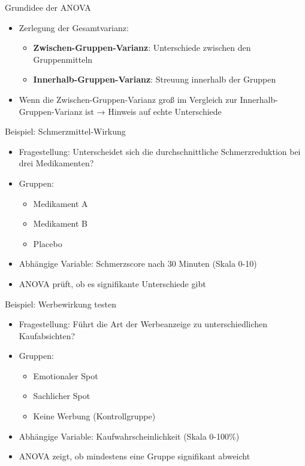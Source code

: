 \documentclass[
  ignorenonframetext,
]{beamer}
\providecommand{\tightlist}{%
  \setlength{\itemsep}{0pt}\setlength{\parskip}{0pt}}
\begin{document}
\begin{frame}{Grundidee der ANOVA}
\protect{}\label{grundidee-der-anova}
\begin{itemize}
\tightlist
\item
  Zerlegung der Gesamtvarianz:

  \begin{itemize}
  \tightlist
  \item
    \textbf{Zwischen-Gruppen-Varianz}: Unterschiede zwischen den
    Gruppenmitteln
  \item
    \textbf{Innerhalb-Gruppen-Varianz}: Streuung innerhalb der Gruppen
  \end{itemize}
\item
  Wenn die Zwischen-Gruppen-Varianz groß im Vergleich zur
  Innerhalb-Gruppen-Varianz ist → Hinweis auf echte Unterschiede
\end{itemize}
\end{frame}

\begin{frame}{Beispiel: Schmerzmittel-Wirkung}
\protect{}\label{beispiel-schmerzmittel-wirkung}
\begin{itemize}
\tightlist
\item
  Fragestellung: Unterscheidet sich die durchschnittliche
  Schmerzreduktion bei drei Medikamenten?
\item
  Gruppen:

  \begin{itemize}
  \tightlist
  \item
    Medikament A
  \item
    Medikament B
  \item
    Placebo
  \end{itemize}
\item
  Abhängige Variable: Schmerzscore nach 30 Minuten (Skala 0-10)
\item
  ANOVA prüft, ob es signifikante Unterschiede gibt
\end{itemize}
\end{frame}

\begin{frame}{Beispiel: Werbewirkung testen}
\protect{}\label{beispiel-werbewirkung-testen}
\begin{itemize}
\tightlist
\item
  Fragestellung: Führt die Art der Werbeanzeige zu unterschiedlichen
  Kaufabsichten?
\item
  Gruppen:

  \begin{itemize}
  \tightlist
  \item
    Emotionaler Spot
  \item
    Sachlicher Spot
  \item
    Keine Werbung (Kontrollgruppe)
  \end{itemize}
\item
  Abhängige Variable: Kaufwahrscheinlichkeit (Skala 0-100\%)
\item
  ANOVA zeigt, ob mindestens eine Gruppe signifikant abweicht
\end{itemize}
\end{frame}
\end{document}
